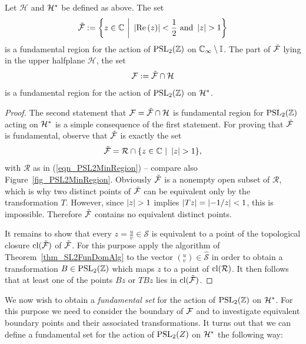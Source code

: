 \begin{theorem}
\label{thm_PSL2FunDom}
Let $\mathcal{H}$ and $\mathcal{H}^\ast$ be defined as above. The set
\begin{equation}
\tilde{\mathcal{F}} := \bigg\{ z \in \mathbb{C} \ \bigg| \ \left|\operatorname{Re}\left(z\right)\right| < \frac{1}{2} \text{ and } \left|z\right| > 1 \bigg\}
\end{equation}
is a fundamental region for the action of $\operatorname{PSL}_{2}(\mathbb{Z})$ on $\mathbb{C}_{\infty} \setminus \mathbb{I}$. The part of $\tilde{\mathcal{F}}$ lying in the upper halfplane $\mathcal{H}$, \ie the set
\begin{equation}
\label{eqn_PSL2FunDom}
\mathcal{F} := \tilde{\mathcal{F}} \cap \mathcal{H}
\end{equation}
is a fundamental region for the action of $\operatorname{PSL}_{2}(\mathbb{Z})$ on $\mathcal{H}^\ast$.
\end{theorem}
\begin{proof}
The second statement that $\mathcal{F} = \tilde{\mathcal{F}} \cap \mathcal{H}$ is fundamental region for $\operatorname{PSL}_{2}(\mathbb{Z})$ acting on $\mathcal{H}^\ast$ is a simple consequence of the first statement. For proving that $\tilde{\mathcal{F}}$ is fundamental,  observe that $\tilde{\mathcal{F}}$ is exactly the set
\begin{equation*}
\tilde{\mathcal{F}} = \mathcal{R} \cap \{ z \in \mathbb{C} \ | \ \left|z\right| > 1 \},
\end{equation*}
with $\mathcal{R}$ as in (\ref{eqn_PSL2MinRegion}) -- compare also Figure~\ref{fig_PSL2MinRegion}. Obviously $\tilde{\mathcal{F}}$ is a nonempty open subset of $\mathcal{R}$, which is why two distinct points of $\tilde{\mathcal{F}}$ can be equivalent only by the transformation $T$. However, since $\left|z\right| > 1$ implies $\left|Tz\right| = \left|-1/z\right| < 1$, this is impossible. Therefore $\tilde{\mathcal{F}}$ contains no equivalent distinct points.

It remains to show that every $z = \frac{u}{v} \in \mathcal{S}$ is equivalent to a point of the topological closure $\operatorname{cl}(\tilde{\mathcal{F}})$ of $\tilde{\mathcal{F}}$. For this purpose apply the algorithm of Theorem~\ref{thm_SL2FunDomAlg} to the vector $({}^u_v) \in \hat{\mathcal{S}}$ in order to obtain a transformation $B \in \operatorname{PSL}_{2}(\mathbb{Z})$ which maps $z$ to a point of $\operatorname{cl}(\mathcal{R})$. It then follows that at least one of the points $Bz$ or $TBz$ lies in $\operatorname{cl}(\tilde{\mathcal{F}})$.
\end{proof}

We now wish to obtain a \emph{fundamental set} for the action of $\operatorname{PSL}_{2}(\mathbb{Z})$ on $\mathcal{H}^\ast$. For this purpose we need to consider the boundary of $\mathcal{F}$ and to investigate equivalent boundary points and their associated transformations. It turns out that we can define a fundamental set for the action of $\operatorname{PSL}_{2}(Z)$ on $\mathcal{H}^\ast$ the following way:

